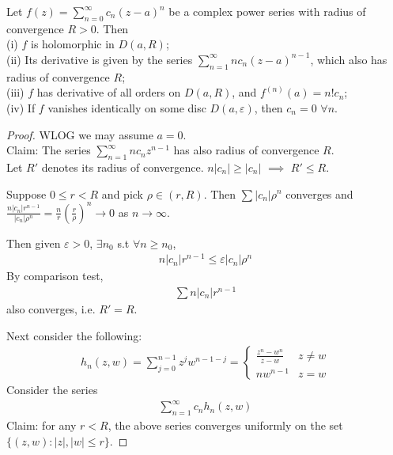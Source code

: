 \documentclass[a4paper]{article}
\begin{document}
\begin{thm}
Let $f(z) = \sum_{n=0}^\infty c_n(z-a)^n$ be a complex power series with radius of convergence $R>0$. Then\\
(i) $f$ is holomorphic in $D(a,R)$;\\
(ii) Its derivative is given by the series $\sum_{n=1}^\infty n c_n (z-a)^{n-1}$, which also has radius of convergence $R$;\\
(iii) $f$ has derivative of all orders on $D(a,R)$, and $f^{(n)}(a) = n! c_n$;\\
(iv) If $f$ vanishes identically on some disc $D(a,\varepsilon)$, then $c_n=0$ $\forall n$.
\begin{proof}
WLOG we may assume $a=0$.\\
Claim: The series $\sum_{n=1}^\infty nc_n z^{n-1}$ has also radius of convergence $R$.\\
Let $R'$ denotes its radius of convergence. $n|c_n| \geq |c_n|$ $\implies $ $R' \leq R$.

Suppose $0 \leq r < R$ and pick $\rho \in (r,R)$. Then $\sum |c_n| \rho^n$ converges and $\frac{n|c_n| r^{n-1}}{|c_n|\rho^n} = \frac{n}{r}(\frac{r}{\rho})^n \to 0$ as $n \to \infty$.

Then given $\varepsilon>0$, $\exists n_0$ s.t $\forall n \geq n_0$,
\begin{equation*}
\begin{aligned}
n|c_n|r^{n-1} \leq \varepsilon|c_n| \rho^n
\end{aligned}
\end{equation*}
By comparison test,
\begin{equation*}
\begin{aligned}
\sum n|c_n|r^{n-1}
\end{aligned}
\end{equation*}
also converges, i.e. $R' = R$.

Next consider the following:
\begin{equation*}
\begin{aligned}
h_n(z,w) = \sum_{j=0}^{n-1} z^j w^{n-1-j} = \left\{\begin{array}{ll}
\frac{z^n-w^n}{z-w} & z \neq w\\
nw^{n-1} & z=w
\end{array}\right.
\end{aligned}
\end{equation*}
Consider the series
\begin{equation*}
\begin{aligned}
\sum_{n=1}^\infty c_n h_n(z,w)
\end{aligned}
\end{equation*}
Claim: for any $r<R$, the above series converges uniformly on the set $\{(z,w):|z|,|w| \leq r\}$.


\end{proof}
\end{thm}
\end{document}
